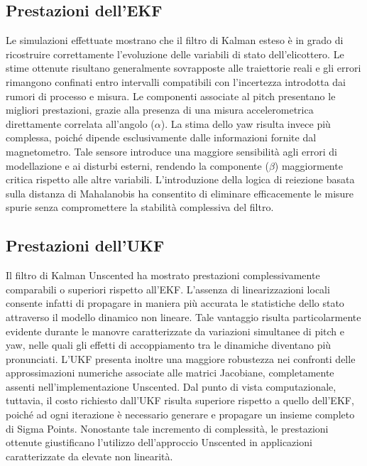 \documentclass[12pt,a4paper]{article}
\begin{document}
\subsection{Prestazioni dell'EKF}
Le simulazioni effettuate mostrano che il filtro di Kalman esteso è in grado di ricostruire correttamente l'evoluzione delle variabili di stato dell'elicottero.
Le stime ottenute risultano generalmente sovrapposte alle traiettorie reali e gli errori rimangono confinati entro intervalli compatibili con l'incertezza introdotta dai rumori di processo e misura.
Le componenti associate al pitch presentano le migliori prestazioni, grazie alla presenza di una misura accelerometrica direttamente correlata all'angolo ($\alpha$).
La stima dello yaw risulta invece più complessa, poiché dipende esclusivamente dalle informazioni fornite dal magnetometro. Tale sensore introduce una maggiore sensibilità agli errori di modellazione e ai disturbi esterni, rendendo la componente ($\beta$) maggiormente critica rispetto alle altre variabili.
L'introduzione della logica di reiezione basata sulla distanza di Mahalanobis ha consentito di eliminare efficacemente le misure spurie senza compromettere la stabilità complessiva del filtro.

\subsection{Prestazioni dell'UKF}
Il filtro di Kalman Unscented ha mostrato prestazioni complessivamente comparabili o superiori rispetto all'EKF.
L'assenza di linearizzazioni locali consente infatti di propagare in maniera più accurata le statistiche dello stato attraverso il modello dinamico non lineare.
Tale vantaggio risulta particolarmente evidente durante le manovre caratterizzate da variazioni simultanee di pitch e yaw, nelle quali gli effetti di accoppiamento tra le dinamiche diventano più pronunciati.
L'UKF presenta inoltre una maggiore robustezza nei confronti delle approssimazioni numeriche associate alle matrici Jacobiane, completamente assenti nell'implementazione Unscented.
Dal punto di vista computazionale, tuttavia, il costo richiesto dall'UKF risulta superiore rispetto a quello dell'EKF, poiché ad ogni iterazione è necessario generare e propagare un insieme completo di Sigma Points.
Nonostante tale incremento di complessità, le prestazioni ottenute giustificano l'utilizzo dell'approccio Unscented in applicazioni caratterizzate da elevate non linearità.
\end{document}
